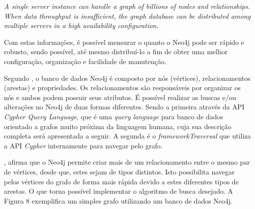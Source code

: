 \begin{citacao}
	\textit{A single server instance can handle a graph of billions of nodes and relationships. When data throughput is insufficient, the graph database can be distributed among multiple servers in a high availability configuration.}\footnotemark[11]
\end{citacao}


\par Com estas informações, é possível mensurar o quanto o Neo4j pode ser rápido e robusto, sendo possível, até mesmo distribuí-lo a fim de obter uma melhor configuração, organização e facilidade de manutenção.

\par Segundo , o banco de dados Neo4j é composto por nós (vértices), relacionamentos (arestas) e propriedades. Os relacionamentos são responsáveis por organizar os nós e ambos podem possuir seus atributos. É possível realizar as buscas e/ou alterações no Neo4j de duas formas diferentes. Sendo a primeira através da API \textit{Cypher Query Language}, que é uma \textit{query language} para banco de dados orientado a grafos muito próxima da linguagem humana, cuja sua descrição completa será apresentada a seguir. A segunda é o \textit{framework\footnotemark[12] Traversal} que utiliza a API \textit{Cypher} internamente para navegar pelo grafo.



, afirma que o Neo4j permite criar mais de um relacionamento entre o mesmo par de vértices, desde que, estes sejam de tipos distintos. Isto possibilita navegar pelos vértices do grafo de forma mais rápida devido a estes diferentes tipos de arestas. O que torna possível implementar o algoritmo de busca desejado. A Figura 8 exemplifica um simples grafo utilizando um banco de dados Neo4j.


